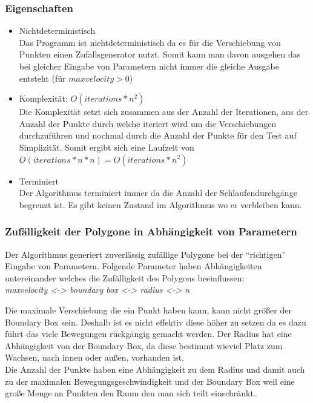 \subsubsection{Eigenschaften}
\begin{itemize}
	\item Nichtdeterministisch\\
	Das Programm ist nichtdeterministisch da es für die Verschiebung von Punkten einen Zufallsgenerator nutzt. Somit kann man davon ausgehen das bei gleicher Eingabe von Parametern nicht immer die gleiche Ausgabe entsteht (für $maxvelocity > 0$)
	\item Komplexität: $O(iterations*n^2)$\\
	Die Komplexität setzt sich zusammen aus der Anzahl der Iterationen, aus der Anzahl der Punkte durch welche iteriert wird um die Verschiebungen durchzuführen und nochmal durch die Anzahl der Punkte für den Test auf Simplizität. Somit ergibt sich eine Laufzeit von $O(iterations*n*n) = O(iterations*n^2)$
	\item Terminiert\\
	Der Algorithmus terminiert immer da die Anzahl der Schlaufendurchgänge begrenzt ist. Es gibt keinen Zustand im Algorithmus wo er verbleiben kann.
\end{itemize}

\subsubsection{Zufälligkeit der Polygone in Abhängigkeit von Parametern}
Der Algorithmus generiert zuverlässig zufällige Polygone bei der \enquote{richtigen} Eingabe von Parametern. Folgende Parameter haben Abhängigkeiten untereinander welches die Zufälligkeit des Polygons beeinflussen:\\
\textit{maxvelocity <-> boundary box <-> radius <-> n}

Die maximale Verschiebung die ein Punkt haben kann, kann nicht größer der Boundary Box sein. Deshalb ist es nicht effektiv diese höher zu setzen da es dazu führt das viele Bewegungen rückgängig gemacht werden.
Der Radius hat eine Abhängigkeit von der Boundary Box, da diese bestimmt wieviel Platz zum Wachsen, nach innen oder außen, vorhanden ist.\\
Die Anzahl der Punkte haben eine Abhängigkeit zu dem Radius und damit auch zu der maximalen Bewegungsgeschwindigkeit und der Boundary Box weil eine große Menge an Punkten den Raum den man sich teilt einschränkt.
